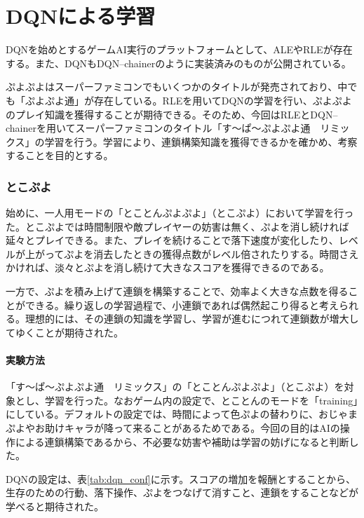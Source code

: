 \documentclass[12pt]{jarticle}
\begin{document}

\part{DQNによる学習} \setcounter{section}{0}
DQNを始めとするゲームAI実行のプラットフォームとして、ALE\cite{ALE}やRLE\cite{RLE}が存在する。また、DQNもDQN--chainer\cite{DQN_chainer}のように実装済みのものが公開されている。

ぷよぷよはスーパーファミコンでもいくつかのタイトルが発売されており、中でも「ぷよぷよ通」が存在している。RLEを用いてDQNの学習を行い、ぷよぷよのプレイ知識を獲得することが期待できる。そのため、今回はRLEとDQN--chainerを用いてスーパーファミコンのタイトル「す～ぱ～ぷよぷよ通　リミックス」の学習を行う。学習により、連鎖構築知識を獲得できるかを確かめ、考察することを目的とする。


\section{とこぷよ}
始めに、一人用モードの「とことんぷよぷよ」（とこぷよ）において学習を行った。とこぷよでは時間制限や敵プレイヤーの妨害は無く、ぷよを消し続ければ延々とプレイできる。また、プレイを続けることで落下速度が変化したり、レベルが上がってぷよを消去したときの獲得点数がレベル倍されたりする。時間さえかければ、淡々とぷよを消し続けて大きなスコアを獲得できるのである。

一方で、ぷよを積み上げて連鎖を構築することで、効率よく大きな点数を得ることができる。繰り返しの学習過程で、小連鎖であれば偶然起こり得ると考えられる。理想的には、その連鎖の知識を学習し、学習が進むにつれて連鎖数が増大してゆくことが期待された。

\subsection{実験方法}
「す～ぱ～ぷよぷよ通　リミックス」の「とことんぷよぷよ」（とこぷよ）を対象とし、学習を行った。なおゲーム内の設定で、とことんのモードを「training」にしている。デフォルトの設定では、時間によって色ぷよの替わりに、おじゃまぷよやお助けキャラが降って来ることがあるためである。今回の目的はAIの操作による連鎖構築であるから、不必要な妨害や補助は学習の妨げになると判断した。

DQNの設定は、表\ref{tab:dqn_conf}に示す。スコアの増加を報酬とすることから、生存のための行動、落下操作、ぷよをつなげて消すこと、連鎖をすることなどが学べると期待された。
\end{document}

